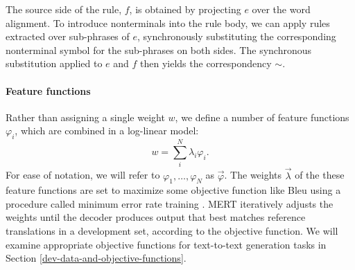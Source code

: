 \documentclass[11pt]{article}
\begin{document}
The source side of the rule, $f$, is obtained by projecting $e$ over
the word alignment. To introduce nonterminals into the rule body, we
can apply rules extracted over sub-phrases of $e$, synchronously
substituting the corresponding nonterminal symbol for the sub-phrases
on both sides. The synchronous substitution applied to $e$ and $f$
then yields the correspondency $\sim$.


\paragraph{Feature functions}

Rather than assigning a single weight $w$, we define a number of feature
functions $\varphi_i$, which are combined in a log-linear model:
\begin{equation}
  w = \sum_i^N \lambda_i \varphi_i .
\end{equation}
For ease of notation, we will refer to $\varphi_1, \ldots ,\varphi_N$
as $\vec{\varphi}$. 
The weights $\vec{\lambda}$ of the these feature functions are set to maximize some objective function like Bleu \cite{Papineni2002} using a procedure called minimum error rate training \cite{Och2003c}.  MERT iteratively adjusts the weights until the decoder produces output that best matches reference translations in a development set, according to the objective function.  We will examine appropriate objective functions for text-to-text generation tasks in Section \ref{dev-data-and-objective-functions}.
\end{document}
